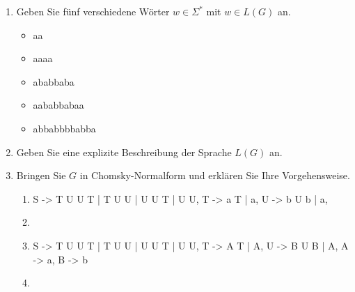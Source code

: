 \documentclass{bschlangaul-aufgabe}
\begin{document}
\begin{enumerate}


\item Geben Sie fünf verschiedene Wörter $w \in \Sigma^*$ mit $w \in
L(G)$ an.

\begin{bAntwort}
\begin{itemize}
\item aa
\item aaaa
\item ababbaba
\item aababbabaa
\item abbabbbbabba
\end{itemize}
\end{bAntwort}


\item Geben Sie eine explizite Beschreibung der Sprache $L(G)$ an.

\begin{bAntwort}
\end{bAntwort}


\item Bringen Sie $G$ in Chomsky-Normalform und erklären Sie Ihre
Vorgehensweise.

\begin{bAntwort}
\begin{enumerate}
\item {}

\begin{bProduktionsRegeln}
S -> T U U T | T U U | U U T | U U,
T -> a T | a,
U -> b U b | a,
\end{bProduktionsRegeln}

\item {}

\bNichtsZuTun

\item {}

\begin{bProduktionsRegeln}
S -> T U U T | T U U | U U T | U U,
T -> A T | A,
U -> B U B | A,
A -> a,
B -> b
\end{bProduktionsRegeln}

\item {}



\end{enumerate}
\end{bAntwort}
\end{enumerate}
\end{document}
